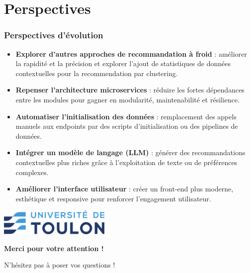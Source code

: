 \documentclass{beamer}
\begin{document}
\section{Perspectives}
\begin{frame}
    \frametitle{Perspectives d'évolution}
    \small
    \begin{itemize}
        \item \textbf{Explorer d'autres approches de recommandation à froid} :
              améliorer la rapidité et la précision et explorer l'ajout de statistiques de données contextuelles pour la recommendation par clustering.

        \item \textbf{Repenser l'architecture microservices} :
              réduire les fortes dépendances entre les modules pour gagner en modularité, maintenabilité et résilience.

        \item \textbf{Automatiser l’initialisation des données} :
              remplacement des appels manuels aux endpoints par des scripts d’initialisation ou des pipelines de données.

        \item \textbf{Intégrer un modèle de langage (LLM)} :
              générer des recommandations contextuelles plus riches grâce à l’exploitation de texte ou de préférences complexes.

        \item \textbf{Améliorer l’interface utilisateur} :
              créer un front-end plus moderne, esthétique et responsive pour renforcer l’engagement utilisateur.
    \end{itemize}
\end{frame}



\begin{frame}[c]
    \centering
    \includegraphics[width=0.4\textwidth]{logo.png}

    \vspace{1cm}
    {\Huge \textbf{Merci pour votre attention !}}

    \vspace{1.5cm}
    {\Large N'hésitez pas à poser vos questions !}
\end{frame}
\end{document}
